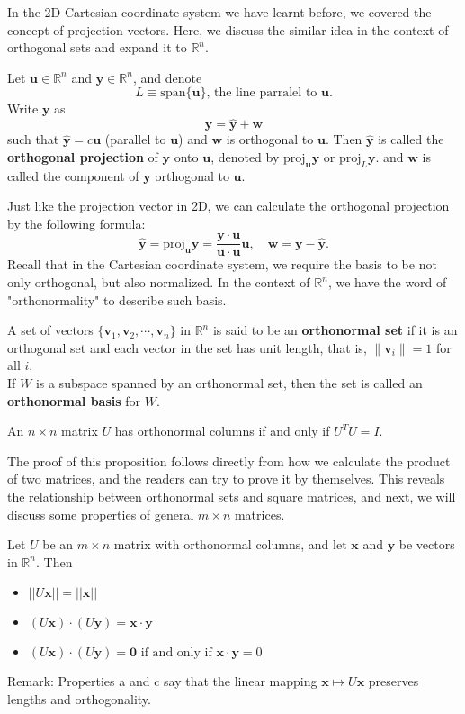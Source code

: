 \documentclass[10pt, a4paper]{article}
\newcommand{\R}{\mathbb{R}}
\newcommand{\vt}[1]{\mathbf{#1}}
\begin{document}
\indent In the 2D Cartesian coordinate system we have learnt before, we covered the concept of projection vectors. Here, we discuss the similar idea in the context of orthogonal sets and expand it to $\R^n$.
\begin{definition}
    Let $\vt{u}\in\R^n$ and $\vt{y}\in\R^n$, and denote\[
    L \equiv \text{span}\{\vt{u}\} \text{, the line parralel to $\vt{u}$}.
    \]
     Write $\vt{y}$ as $$\vt{y} = \hat{\vt{y}}+\vt{w}$$ such that $\hat{\vt{y}}=c\vt{u}$ (parallel to $\vt{u}$) and $\vt{w}$ is orthogonal to $\vt{u}$. 
    Then $\hat{\vt{y}}$ is called the \textbf{orthogonal projection} of $\vt{y}$ onto $\vt{u}$, denoted by $\text{proj}_{\vt{u}}\vt{y}$ or $\text{proj}_{L}\vt{y}$.
     and $\vt{w}$ is called the component of $\vt{y}$ orthogonal to $\vt{u}$.
\end{definition}
Just like the projection vector in 2D, we can calculate the orthogonal projection by the following formula:\[
\hat{\vt{y}} = \text{proj}_{\vt{u}}\vt{y} = \frac{\vt{y}\cdot\vt{u}}{\vt{u}\cdot\vt{u}}\vt{u}, \quad \vt{w} = \vt{y} - \hat{\vt{y}}.
\]
\indent Recall that in the Cartesian coordinate system, we require the basis to be not only orthogonal, but also normalized. In the context of $\R^n$, we have the word of "orthonormality" to describe such basis.
\begin{definition}
    A set of vectors $\{\vt{v}_1, \vt{v}_2, \cdots, \vt{v}_n\}$ in $\R^n$ is said to be an \textbf{orthonormal set} if it is an orthogonal set and each vector in the set has unit length, that is, $\|\vt{v}_i\| = 1$ for all $i$.\\
    If $W$ is a subspace spanned by an orthonormal set, then the set is called an \textbf{orthonormal basis} for $W$.
\end{definition}
\begin{proposition}
    An $n\times n$ matrix $U$ has orthonormal columns if and only if $U^TU = I$.
\end{proposition}
\indent The proof of this proposition follows directly from how we calculate the product of two matrices, and the readers can try to prove it by themselves. 
This reveals the relationship between orthonormal sets and square matrices, and next, we will discuss some properties of general $m\times n$ matrices.
\begin{proposition}
    Let $U$ be an $m\times n$ matrix with orthonormal columns, and let $\vt{x}$ and $\vt{y}$ be vectors in $\R^n$. Then
    \begin{itemize}
        \item $||U\vt{x}||=||\vt{x}||$
        \item $(U\vt{x})\cdot(U\vt{y}) = \vt{x}\cdot\vt{y}$
        \item $(U\vt{x})\cdot(U\vt{y}) = \vt{0} \text{ if and only if } \vt{x}\cdot\vt{y} = 0$
    \end{itemize}
    Remark: Properties a and c say that the linear mapping $\vt{x} \mapsto U \vt{x}$ preserves lengths and orthogonality.
\end{proposition}
\end{document}
